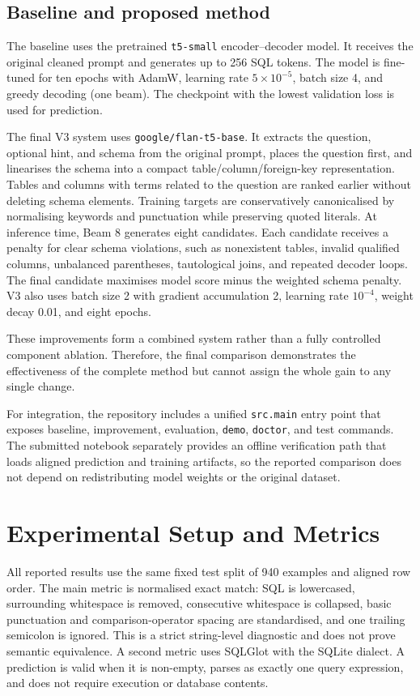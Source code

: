 \documentclass[10pt,a4paper]{article}
\begin{document}
\subsection{Baseline and proposed method}
The baseline uses the pretrained \texttt{t5-small} encoder--decoder model. It receives the original cleaned prompt and generates up to 256 SQL tokens. The model is fine-tuned for ten epochs with AdamW, learning rate $5\times10^{-5}$, batch size 4, and greedy decoding (one beam). The checkpoint with the lowest validation loss is used for prediction.

The final V3 system uses \texttt{google/flan-t5-base}. It extracts the question, optional hint, and schema from the original prompt, places the question first, and linearises the schema into a compact table/column/foreign-key representation. Tables and columns with terms related to the question are ranked earlier without deleting schema elements. Training targets are conservatively canonicalised by normalising keywords and punctuation while preserving quoted literals. At inference time, Beam 8 generates eight candidates. Each candidate receives a penalty for clear schema violations, such as nonexistent tables, invalid qualified columns, unbalanced parentheses, tautological joins, and repeated decoder loops. The final candidate maximises model score minus the weighted schema penalty. V3 also uses batch size 2 with gradient accumulation 2, learning rate $10^{-4}$, weight decay 0.01, and eight epochs.

These improvements form a combined system rather than a fully controlled component ablation. Therefore, the final comparison demonstrates the effectiveness of the complete method but cannot assign the whole gain to any single change.

For integration, the repository includes a unified \texttt{src.main} entry point that exposes baseline, improvement, evaluation, \texttt{demo}, \texttt{doctor}, and test commands. The submitted notebook separately provides an offline verification path that loads aligned prediction and training artifacts, so the reported comparison does not depend on redistributing model weights or the original dataset.

\section{Experimental Setup and Metrics}
All reported results use the same fixed test split of 940 examples and aligned row order. The main metric is normalised exact match: SQL is lowercased, surrounding whitespace is removed, consecutive whitespace is collapsed, basic punctuation and comparison-operator spacing are standardised, and one trailing semicolon is ignored. This is a strict string-level diagnostic and does not prove semantic equivalence. A second metric uses SQLGlot with the SQLite dialect. A prediction is valid when it is non-empty, parses as exactly one query expression, and does not require execution or database contents.
\end{document}
